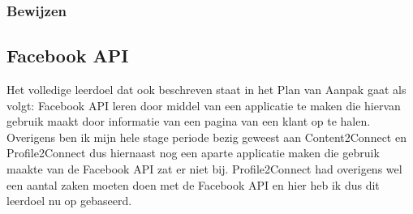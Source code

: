 \subsubsection{Bewijzen}




\subsection{Facebook API}
Het volledige leerdoel dat ook beschreven staat in het Plan van Aanpak gaat als volgt: Facebook API leren door middel van een applicatie te maken die hiervan gebruik maakt door informatie van een pagina van een klant op te halen. Overigens ben ik mijn hele stage periode bezig geweest aan Content2Connect en Profile2Connect dus hiernaast nog een aparte applicatie maken die gebruik maakte van de Facebook API zat er niet bij. Profile2Connect had overigens wel een aantal zaken moeten doen met de Facebook API en hier heb ik dus dit leerdoel nu op gebaseerd.

